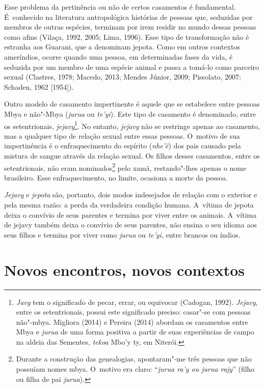 Esse problema da pertinência ou não de certos casamentos é fundamental.
É~conhecido na literatura antropológica histórias de pessoas que,
seduzidas por membros de outras espécies, terminam por irem residir no
mundo dessas pessoas como afins (Vilaça, 1992, 2005; Lima, 1996). Esse
tipo de transformação não é estranha aos Guarani, que a denominam
jepota. Como em outros contextos ameríndios, ocorre quando uma pessoa,
em determinadas fases da vida, é seduzida por um membro de uma espécie
animal e passa a tomá-lo como parceiro sexual (Clastres, 1978; Macedo,
2013; Mendes Júnior, 2009; Pissolato, 2007; Schaden, 1962 [1954]).

Outro modelo de casamento impertinente é aquele que se estabelece entre
pessoas Mbya e não"-Mbya (\emph{jurua} ou \emph{te’yi}). Este tipo de casamento é
denominado, entre os setentrionais, \emph{jejavy}\footnote{\emph{Javy} tem o
significado de pecar, errar, ou equivocar (Cadogan, 1992). \emph{Jejavy},
entre os setentrionais, possui este significado preciso: casar"-se com
pessoas não"-mbya. Migliora (2014) e Pereira (2014) abordam os
casamentos entre Mbya e \emph{jurua} de uma forma positiva a partir de suas
experiências de campo na aldeia das Sementes, \emph{tekoa} Mbo’y ty, em
Niterói.}. No entanto, \emph{jejavy} não se restringe apenas ao casamento, mas
a qualquer tipo de relação sexual entre essas pessoas. O~motivo de sua
impertinência é o enfraquecimento do espírito (\emph{nhe’ë}) dos pais causado
pela mistura de sangue através da relação sexual. Os filhos desses
casamentos, entre os setentrionais, não eram nominados\footnote{Durante
a construção das genealogias, apontaram"-me três pessoas que não
possuíam nomes mbya. O~motivo era claro: ``\emph{jurua ra’y ou jurua rajy}''
(filho ou filha de pai \emph{jurua}).} pelo xamã, restando"-lhes apenas o nome
brasileiro. Esse enfraquecimento, no limite, ocasiona a morte da
pessoa.

\emph{Jejavy} e \emph{jepota} são, portanto, dois modos indesejados de relação com o
exterior e pela mesma razão: a perda da verdadeira condição humana.
A~vítima de jepota deixa o convívio de seus parentes e termina por
viver entre os animais. A~vítima de jejavy também deixa o convívio de
seus parentes, não ensina o seu idioma aos seus filhos e termina por
viver como \emph{jurua} ou \emph{te’yi}, entre brancos ou índios. 

\section{Novos encontros, novos contextos}

